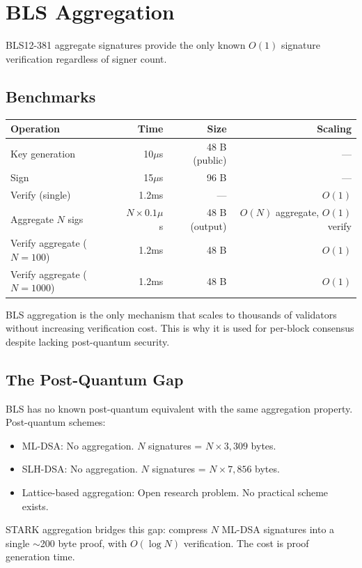 \section{BLS Aggregation}


BLS12-381 aggregate signatures provide the only known $O(1)$ signature verification regardless of signer count.

\subsection{Benchmarks}

\begin{center}
\begin{tabular}{lrrr}
\toprule
\textbf{Operation} & \textbf{Time} & \textbf{Size} & \textbf{Scaling} \\
\midrule
Key generation & 10$\mu$s & 48 B (public) & --- \\
Sign & 15$\mu$s & 96 B & --- \\
Verify (single) & 1.2ms & --- & $O(1)$ \\
Aggregate $N$ sigs & $N \times 0.1\mu$s & 48 B (output) & $O(N)$ aggregate, $O(1)$ verify \\
Verify aggregate ($N=100$) & 1.2ms & 48 B & $O(1)$ \\
Verify aggregate ($N=1000$) & 1.2ms & 48 B & $O(1)$ \\
\bottomrule
\end{tabular}
\end{center}

\begin{observation}
BLS aggregation is the only mechanism that scales to thousands of validators without increasing verification cost. This is why it is used for per-block consensus despite lacking post-quantum security.
\end{observation}

\subsection{The Post-Quantum Gap}

BLS has no known post-quantum equivalent with the same aggregation property. Post-quantum schemes:
\begin{itemize}[leftmargin=2em]
\item ML-DSA: No aggregation. $N$ signatures = $N \times 3{,}309$ bytes.
\item SLH-DSA: No aggregation. $N$ signatures = $N \times 7{,}856$ bytes.
\item Lattice-based aggregation: Open research problem. No practical scheme exists.
\end{itemize}

STARK aggregation bridges this gap: compress $N$ ML-DSA signatures into a single $\sim$200 byte proof, with $O(\log N)$ verification. The cost is proof generation time.


